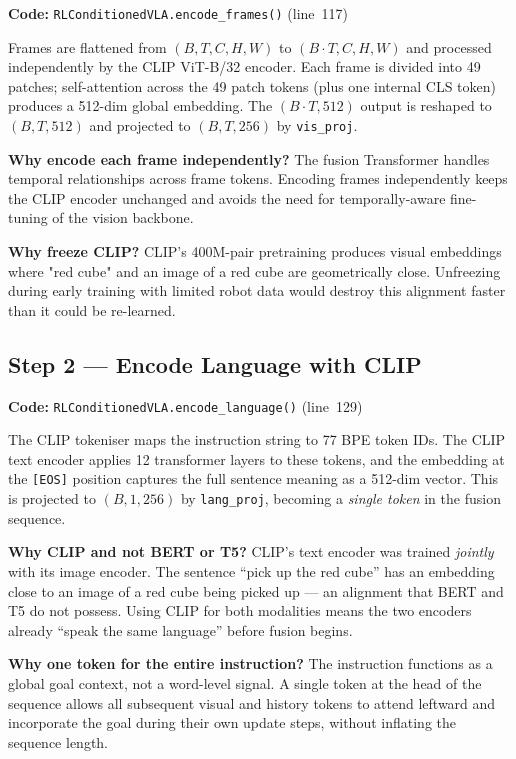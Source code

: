 \documentclass[12pt, a4paper]{article}
\begin{document}
\textbf{Code:} \texttt{RLConditionedVLA.encode\_frames()} (line~117)

Frames are flattened from $(B,T,C,H,W)$ to $(B{\cdot}T,C,H,W)$ and
processed independently by the CLIP ViT-B/32 encoder.
Each frame is divided into 49 patches; self-attention across the 49 patch
tokens (plus one internal CLS token) produces a 512-dim global embedding.
The $(B{\cdot}T,512)$ output is reshaped to $(B,T,512)$ and projected
to $(B,T,256)$ by \texttt{vis\_proj}.

\textbf{Why encode each frame independently?}
The fusion Transformer handles temporal relationships across frame tokens.
Encoding frames independently keeps the CLIP encoder unchanged and avoids
the need for temporally-aware fine-tuning of the vision backbone.

\textbf{Why freeze CLIP?}
CLIP's 400M-pair pretraining produces visual embeddings where "red cube" and
an image of a red cube are geometrically close.
Unfreezing during early training with limited robot data would destroy this
alignment faster than it could be re-learned.

\subsection{Step 2 — Encode Language with CLIP}
\label{sec:step2}

\textbf{Code:} \texttt{RLConditionedVLA.encode\_language()} (line~129)

The CLIP tokeniser maps the instruction string to 77 BPE token IDs.
The CLIP text encoder applies 12 transformer layers to these tokens,
and the embedding at the \texttt{[EOS]} position captures the full
sentence meaning as a 512-dim vector.
This is projected to $(B,1,256)$ by \texttt{lang\_proj}, becoming a
\emph{single token} in the fusion sequence.

\textbf{Why CLIP and not BERT or T5?}
CLIP's text encoder was trained \emph{jointly} with its image encoder.
The sentence ``pick up the red cube'' has an embedding close to an image of
a red cube being picked up — an alignment that BERT and T5 do not possess.
Using CLIP for both modalities means the two encoders already ``speak the
same language'' before fusion begins.

\textbf{Why one token for the entire instruction?}
The instruction functions as a global goal context, not a word-level signal.
A single token at the head of the sequence allows all subsequent visual and
history tokens to attend leftward and incorporate the goal during their own
update steps, without inflating the sequence length.
\end{document}
